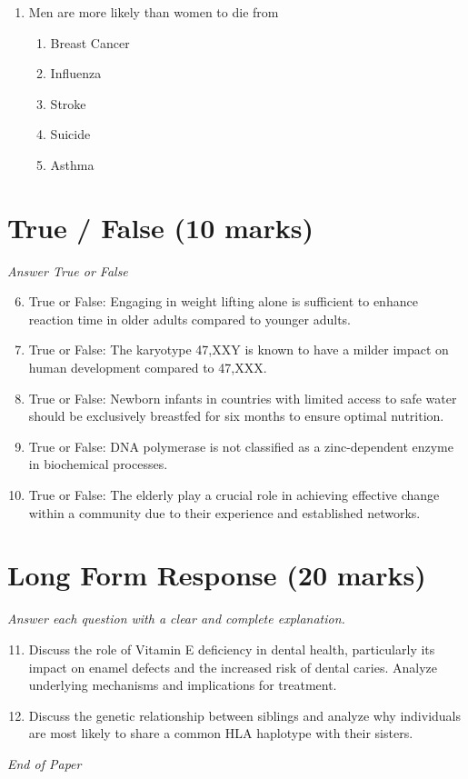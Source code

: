 \documentclass[12pt]{article}
\begin{document}
\begin{enumerate}[label=\arabic*.]
\begin{enumerate}[label=(\alph*)]
    \item Dependent on the individual's stress levels
    \item Randomly determined at birth
    \item Dependent on the individual's gender
    \item Dependent on the individual's diet and exercise
\end{enumerate}
\item Men are more likely than women to die from
\begin{enumerate}[label=(\alph*)]
    \item Breast Cancer
    \item Influenza
    \item Stroke
    \item Suicide
    \item Asthma
\end{enumerate}
\end{enumerate}

\section*{True / False (10 marks)}
\textit{Answer True or False}
\begin{enumerate}[label=\arabic*.]
\setcounter{enumi}{5}
\item True or False: Engaging in weight lifting alone is sufficient to enhance reaction time in older adults compared to younger adults.
\item True or False: The karyotype 47,XXY is known to have a milder impact on human development compared to 47,XXX.
\item True or False: Newborn infants in countries with limited access to safe water should be exclusively breastfed for six months to ensure optimal nutrition.
\item True or False: DNA polymerase is not classified as a zinc-dependent enzyme in biochemical processes.
\item True or False: The elderly play a crucial role in achieving effective change within a community due to their experience and established networks.
\end{enumerate}

\section*{Long Form Response (20 marks)}
\textit{Answer each question with a clear and complete explanation.}
\begin{enumerate}[label=\arabic*.]
\setcounter{enumi}{10}
\item Discuss the role of Vitamin E deficiency in dental health, particularly its impact on enamel defects and the increased risk of dental caries. Analyze underlying mechanisms and implications for treatment.
\item Discuss the genetic relationship between siblings and analyze why individuals are most likely to share a common HLA haplotype with their sisters.
\end{enumerate}

\vfill
\noindent\textit{End of Paper}
\end{document}
